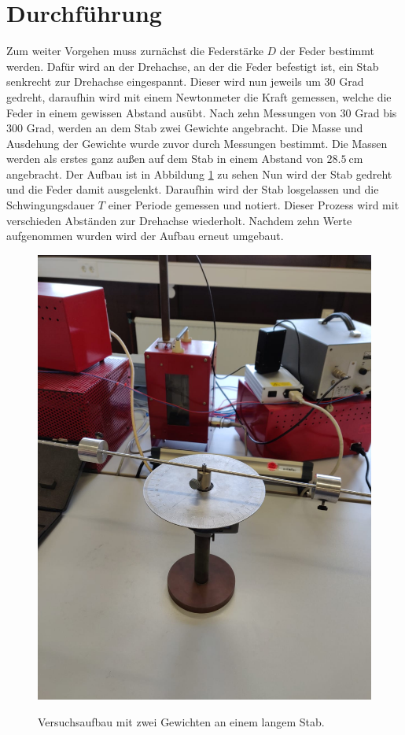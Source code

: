 \section{Durchführung}
\label{sec:Durchführung}

Zum weiter Vorgehen muss zurnächst die Federstärke $D$ der Feder bestimmt werden.
Dafür wird an der Drehachse, an der die Feder befestigt ist, ein Stab senkrecht zur Drehachse eingespannt.
Dieser wird nun jeweils um 30 Grad gedreht, daraufhin wird mit einem Newtonmeter die Kraft gemessen, welche die Feder in einem gewissen Abstand ausübt.
Nach zehn Messungen von 30 Grad bis 300 Grad, werden an dem Stab zwei Gewichte angebracht.
Die Masse und Ausdehung der Gewichte wurde zuvor durch Messungen bestimmt.
Die Massen werden als erstes ganz außen auf dem Stab in einem Abstand von $\SI{28.5}{\centi\meter}$ angebracht.
Der Aufbau ist in Abbildung \ref{fig:StabmitGewicht} zu sehen
Nun wird der Stab gedreht und die Feder damit ausgelenkt.
Daraufhin wird der Stab losgelassen und die Schwingungsdauer $T$ einer Periode gemessen und notiert.
Dieser Prozess wird mit verschieden Abständen zur Drehachse wiederholt.
Nachdem zehn Werte aufgenommen wurden wird der Aufbau erneut umgebaut.

\begin{figure}
\centering
\caption{Versuchsaufbau mit zwei Gewichten an einem langem Stab.}
\includegraphics[scale=0.1]{content/data/StabmitGewichten.png}
\label{fig:StabmitGewicht}
\end{figure}

